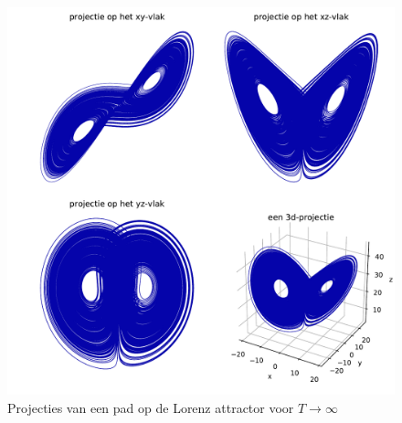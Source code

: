 \documentclass[12pt, a4paper]{article}
\theoremstyle{definition}
\begin{document}
\begin{figure}
    \centering
    \includegraphics[width=0.9\linewidth]{projecties_opdracht_5.pdf}
    \caption{Projecties van een pad op de Lorenz attractor voor $T \rightarrow \infty$}
    \label{fig: projecties}
\end{figure}
\end{document}
